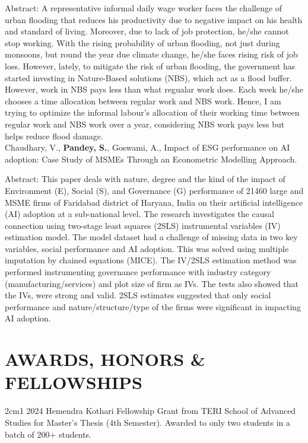 \documentclass[final, 12pt]{article}
\begin{document}
Abstract: A representative informal daily wage worker faces the challenge of urban flooding that reduces his productivity due to negative impact on his health and standard of living. Moreover, due to lack of job protection, he/she cannot stop working. With the rising probability of urban flooding, not just during monsoons, but round the year due climate change, he/she faces rising risk of job loss. However, lately, to mitigate the risk of urban flooding, the government has started investing in Nature-Based solutions (NBS), which act as a flood buffer. However, work in NBS pays less than what regualar work does. Each week he/she chooses a time allocation between regular work and NBS work. Hence, I am trying to optimize the informal labour's allocation of their working time between regular work and NBS work over a year, considering NBS work pays less but helps reduce flood damage.  \\
 
Chaudhary, V., {\bf Pandey, S.}, Goswami, A., Impact of ESG performance on AI adoption: Case Study of MSMEs Through an Econometric Modelling Approach.

Abstract: This paper deals with nature, degree and the kind of the impact of Environment (E), Social (S), and Governance (G) performance of 21460 large and MSME firms of Faridabad district of Haryana, India on their artificial intelligence (AI) adoption at a sub-national level. The research investigates the causal connection using two-stage least squares (2SLS) instrumental variables (IV) estimation model. The model dataset had a challenge of missing data in two key variables, social performance and AI adoption. This was solved using multiple imputation by chained equations (MICE). The IV/2SLS estimation method was performed instrumenting governance performance with industry category (manufacturing/services) and plot size of firm as IVs. The tests also showed that the IVs, were strong and valid. 2SLS estimates suggested that only social performance and nature/structure/type of the firms were significant in impacting AI adoption. \\

\section*{AWARDS, HONORS \& FELLOWSHIPS}

\begin{hangparas}{2cm}{1}
2024 \tabto{2cm}  Hemendra Kothari Fellowship Grant from TERI School of Advanced Studies for Master's Thesis (4th Semester). Awarded to only two students in a batch of 200+ students. \\
\end{hangparas}
\end{document}
